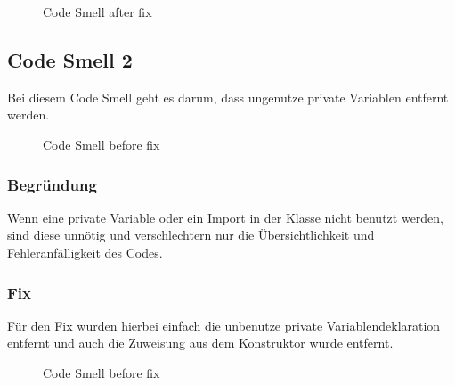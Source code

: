         \begin{figure}[h]
	        \centering
	        \caption{Code Smell  after fix}
	        \label{a.2.cleanArchitecture}
        \end{figure}
    
    

    \subsection{Code Smell 2}
    Bei diesem Code Smell geht es darum, dass ungenutze private Variablen entfernt werden.
    \begin{figure}[h]
	    \centering
	    \caption{Code Smell  before fix}
	    \label{a.2.cleanArchitecture}
    \end{figure}

        \subsubsection{Begründung}
        Wenn eine private Variable oder ein Import in der Klasse nicht benutzt werden, sind diese unnötig und verschlechtern nur die Übersichtlichkeit und Fehleranfälligkeit des Codes. 

        \subsubsection{Fix}
        Für den Fix wurden hierbei einfach die unbenutze private Variablendeklaration entfernt und auch die Zuweisung aus dem Konstruktor wurde entfernt.
        \begin{figure}[h]
	        \centering
	        \caption{Code Smell  before fix}
	        \label{a.2.cleanArchitecture}
        \end{figure}
